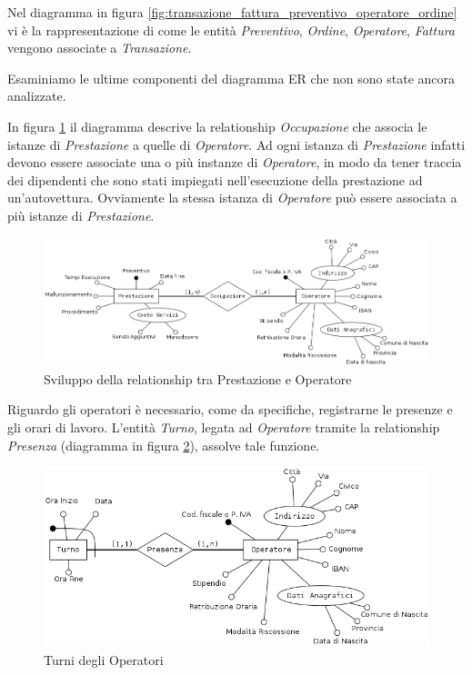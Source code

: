 			Nel diagramma in figura \ref{fig:transazione_fattura_preventivo_operatore_ordine} vi è la rappresentazione di come le entità \emph{Preventivo}, \emph{Ordine}, \emph{Operatore}, \emph{Fattura} vengono associate a \emph{Transazione}.
			
			Esaminiamo le ultime componenti del diagramma ER che non sono state ancora analizzate.
			
			In figura \ref{fig:operatore_prestazione} il diagramma descrive la relationship \emph{Occupazione} che associa le istanze di \emph{Prestazione} a quelle di \emph{Operatore}. Ad ogni istanza di \emph{Prestazione} infatti devono essere associate una o più instanze di \emph{Operatore}, in modo da tener traccia dei dipendenti che sono stati impiegati nell'esecuzione della prestazione ad un'autovettura. Ovviamente la stessa istanza di \emph{Operatore} può essere associata a più istanze di \emph{Prestazione}.
			
			\begin{figure}
				\centering
				\includegraphics[width=11.5cm]{images/finitures/operatore_prestazione.png}
				\caption{Sviluppo della relationship tra Prestazione e Operatore}
				\label{fig:operatore_prestazione}
			\end{figure}
			
			Riguardo gli operatori è necessario, come da specifiche, registrarne le presenze e gli orari di lavoro. L'entità \emph{Turno}, legata ad \emph{Operatore} tramite la relationship \emph{Presenza} (diagramma in figura \ref{fig:operatore_turno}), assolve tale funzione.
			
			\begin{figure}
				\centering
				\includegraphics[width=11.5cm]{images/finitures/operatore_turno.png}
				\caption{Turni degli Operatori}
				\label{fig:operatore_turno}
			\end{figure}
			
